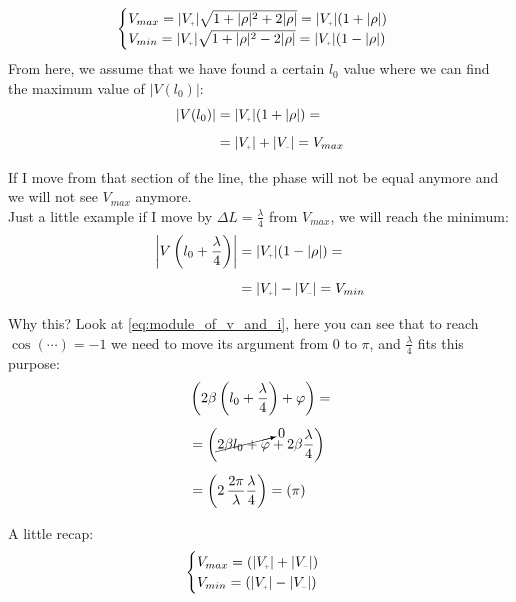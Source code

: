 \begin{equation}
    \begin{cases}
        V_{max} =|V\bottomPlus|\sqrt{1+|\rho|^2+2|\rho|}=|V\bottomPlus|(1+|\rho|)\\
        V_{min} =|V\bottomPlus|\sqrt{1+|\rho|^2-2|\rho|}=|V\bottomPlus|(1-|\rho|)
    \end{cases}\label{eq:vmin_e_vmax}
\end{equation}
From here, we assume that we have found a certain $l_0$ value where we can find the maximum value of $|V(l_0)|$:
\begin{align}
    \begin{split}
    |V(l_0)|&=|V\bottomPlus|(1+|\rho|)=\\[5pt]
    &=|V\bottomPlus|+|V\bottomMinus|=V_{max}\\[5pt]
    \end{split}
\end{align}
If I move from that section of the line, the phase will not be equal anymore and we will not see $V_{max}$ anymore.\\
Just a little example if I move by $\Delta L=\frac{\lambda}{4}$ from $V_{max}$, we will reach the minimum:
\begin{align}
    \begin{split}
        \left|V\left(l_0+\frac{\lambda}{4}\right)\right|&=|V\bottomPlus|(1-|\rho|)=\\[5pt]
        &=|V\bottomPlus|-|V\bottomMinus|=V_{min}\\[5pt]
    \end{split}\label{eq:v_minimum}
\end{align}
Why this? Look at \cref{eq:module_of_v_and_i}, here you can see that to reach $\cos(\cdots)=-1$ we need to move its argument from $0$ to $\pi$, and $\frac{\lambda}{4}$ fits this purpose:
\begin{align}
    \begin{split}
        &\left(2\beta \left(l_0+\frac{\lambda}{4}\right) +\varphi\right) = \\[5pt]
        &=\left(\cancelto{0}{2\beta l_0 +\varphi} +2\beta \frac{\lambda}{4}\right)\\[5pt]
        &=\left(2\,\frac{2\pi}{\lambda} \frac{\lambda}{4} \right)=(\pi)\\[5pt]
    \end{split}
\end{align}
A little recap:
\begin{equation}
    \begin{cases}
        V_{max} =(|V\bottomPlus|+|V\bottomMinus|)\\
        V_{min} =(|V\bottomPlus|-|V\bottomMinus|)
    \end{cases}
\end{equation}
